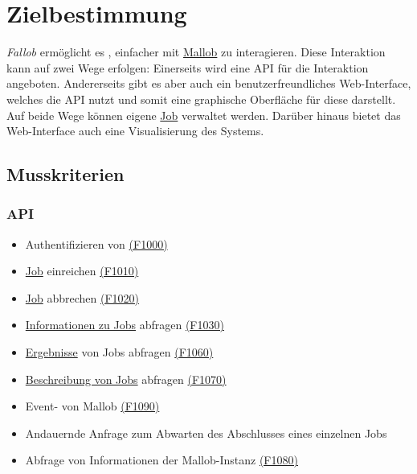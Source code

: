 \section{Zielbestimmung}
\textit{Fallob} ermöglicht es , einfacher mit \href{https://github.com/domschrei/mallob}{Mallob} zu interagieren. Diese Interaktion kann auf zwei Wege erfolgen:
Einerseits wird eine \gls{API} für die Interaktion angeboten. Andererseits gibt es aber auch ein benutzerfreundliches \gls{Web-Interface}, welches die \gls{API} nutzt und somit eine graphische Oberfläche für diese darstellt. Auf beide Wege können eigene \hyperref[B:Jobs]{Job} verwaltet werden. Darüber hinaus bietet das \gls{Web-Interface} auch eine Visualisierung des Systems.


\subsection{Musskriterien}
    \subsubsection{API}
        \begin{itemize}[noitemsep]
            \item Authentifizieren von  \hyperref[FA:API:Authentifizieren von Nutzern]{(F1000)}
            \item \hyperref[B:Jobs]{Job} einreichen \hyperref[FA:API:Einreichen von Jobs]{(F1010)}
            \item \hyperref[B:Jobs]{Job} abbrechen \hyperref[FA:API:Abbrechen von eingereichten Jobs]{(F1020)}
            \item \hyperref[B:Job-Informationen]{Informationen zu Jobs} abfragen \hyperref[FA:API:Abfragen der Informationenen von Jobs]{(F1030)}
            \item \hyperref[B:Job-Ergebnis]{Ergebnisse} von Jobs abfragen \hyperref[FA:API:Ausgeben des Ergebnisses für eine oder mehrere Jobs]{(F1060)}
            \item \hyperref[B:Job-Beschreibung]{Beschreibung von Jobs} abfragen \hyperref[FA:API:Ausgeben der Job-Beschreibung]{(F1070)}
            \item Event- von Mallob  \hyperref[FA:API:Ausgeben eines Event-Streams von Mallob]{(F1090)}
            \item Andauernde Anfrage zum Abwarten des Abschlusses eines einzelnen Jobs
            \item Abfrage von Informationen der Mallob-Instanz \hyperref[FA:API:Abfragen der Informationen von Mallob]{(F1080)}
        \end{itemize}
